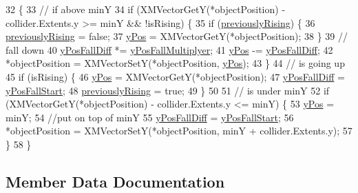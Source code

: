 \begin{DoxyCode}
32 \{
33     \textcolor{comment}{// if above minY }
34     \textcolor{keywordflow}{if} (XMVectorGetY(*objectPosition) - collider.Extents.y >= minY && !isRising) \{
35         \textcolor{keywordflow}{if} (\mbox{\hyperlink{class_physics_helper_a49302833da6c4ac21bf17891de2c696e}{previouslyRising}}) \{
36             \mbox{\hyperlink{class_physics_helper_a49302833da6c4ac21bf17891de2c696e}{previouslyRising}} = \textcolor{keyword}{false};
37             \mbox{\hyperlink{class_physics_helper_a8d1eda19cdbede456e4fb973a19802a4}{yPos}} = XMVectorGetY(*objectPosition);
38         \}
39         \textcolor{comment}{// fall down}
40         \mbox{\hyperlink{class_physics_helper_a0c1293f0d07c93ffa688f67285327d35}{yPosFallDiff}} *= \mbox{\hyperlink{class_physics_helper_a20ab7f606d89b0b12ffdd0a68136da2e}{yPosFallMultiplyer}};
41         \mbox{\hyperlink{class_physics_helper_a8d1eda19cdbede456e4fb973a19802a4}{yPos}} -= \mbox{\hyperlink{class_physics_helper_a0c1293f0d07c93ffa688f67285327d35}{yPosFallDiff}};
42         *objectPosition = XMVectorSetY(*objectPosition, \mbox{\hyperlink{class_physics_helper_a8d1eda19cdbede456e4fb973a19802a4}{yPos}});
43     \}
44     \textcolor{comment}{// is going up}
45     \textcolor{keywordflow}{if} (isRising) \{
46         \mbox{\hyperlink{class_physics_helper_a8d1eda19cdbede456e4fb973a19802a4}{yPos}} = XMVectorGetY(*objectPosition);
47         \mbox{\hyperlink{class_physics_helper_a0c1293f0d07c93ffa688f67285327d35}{yPosFallDiff}} = \mbox{\hyperlink{class_physics_helper_a11582a39916e5ec33325d99d1d67235a}{yPosFallStart}};
48         \mbox{\hyperlink{class_physics_helper_a49302833da6c4ac21bf17891de2c696e}{previouslyRising}} = \textcolor{keyword}{true};
49     \}
50 
51     \textcolor{comment}{// is under minY}
52     \textcolor{keywordflow}{if} (XMVectorGetY(*objectPosition) - collider.Extents.y <= minY) \{
53         \mbox{\hyperlink{class_physics_helper_a8d1eda19cdbede456e4fb973a19802a4}{yPos}} = minY;
54         \textcolor{comment}{//put on top of minY}
55         \mbox{\hyperlink{class_physics_helper_a0c1293f0d07c93ffa688f67285327d35}{yPosFallDiff}} = \mbox{\hyperlink{class_physics_helper_a11582a39916e5ec33325d99d1d67235a}{yPosFallStart}};
56         *objectPosition = XMVectorSetY(*objectPosition, minY + collider.Extents.y);
57     \}
58 \}
\end{DoxyCode}


\subsection{Member Data Documentation}
\mbox{\label{class_physics_helper_a49302833da6c4ac21bf17891de2c696e}} 
